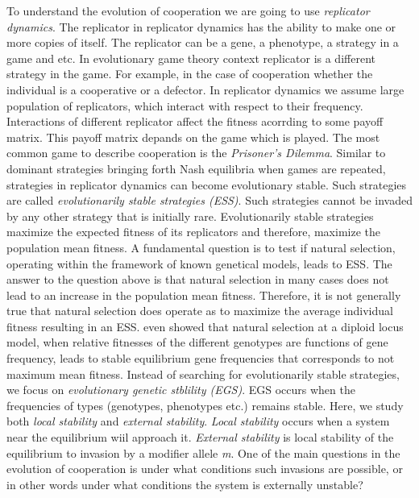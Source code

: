 \documentclass[12pt]{extarticle}
\begin{document}
To understand the evolution of cooperation we are going to use \emph{replicator dynamics}. The replicator in replicator dynamics has the ability to make one or more copies of itself.
The replicator can be a gene, a phenotype, a strategy in a game and etc. In evolutionary game theory context replicator is a different strategy in the game. For example, in the case of cooperation whether the individual is a cooperative or a defector.
In replicator dynamics we assume large population of replicators, which interact with respect to their frequency.
Interactions of different replicator affect the fitness acorrding to some payoff matrix. This payoff matrix depands on the game which is played. 
The most common game to describe cooperation is the \emph{Prisoner's Dilemma}\citep{nowak1992tit}.
Similar to dominant strategies bringing forth Nash equilibria when games are repeated, strategies in replicator dynamics can become evolutionary stable. Such strategies are called \emph{evolutionarily stable strategies (ESS)}.
Such strategies cannot be invaded by any other strategy that is initially rare. Evolutionarily stable strategies maximize the expected fitness of its replicators and therefore, maximize the population mean fitness.
A fundamental question is to test if natural selection, operating within the framework of known genetical models, leads to ESS.
The answer to the question above is that natural selection in many cases does not lead to an increase in the population mean fitness. Therefore, it is not generally true that natural selection does operate as to maximize the average individual fitness resulting in an ESS.
\citet{sacks1967stable} even showed that natural selection at a diploid locus model, when relative fitnesses of the different genotypes are functions of gene frequency, leads to stable equilibrium gene frequencies that corresponds to not maximum mean fitness.
Instead of searching for evolutionarily stable strategies, we focus on \emph{evolutionary genetic stblility (EGS)}\citep{lessard1990evolutionary}. EGS occurs when the frequencies of types (genotypes, phenotypes etc.) remains stable.
Here, we study both \emph{local stability} and \emph{external stability}. \emph{Local stability} occurs when a system near the equilibrium wiil approach it.
\emph{External stability} \citep{Liberman1986modifiers,Altenberg2017} is local stability of the equilibrium to invasion by a modifier allele \emph{m}. One of the main questions in the evolution of cooperation is under what conditions such invasions are possible, or in other words under what conditions the system is externally unstable?
\end{document}
